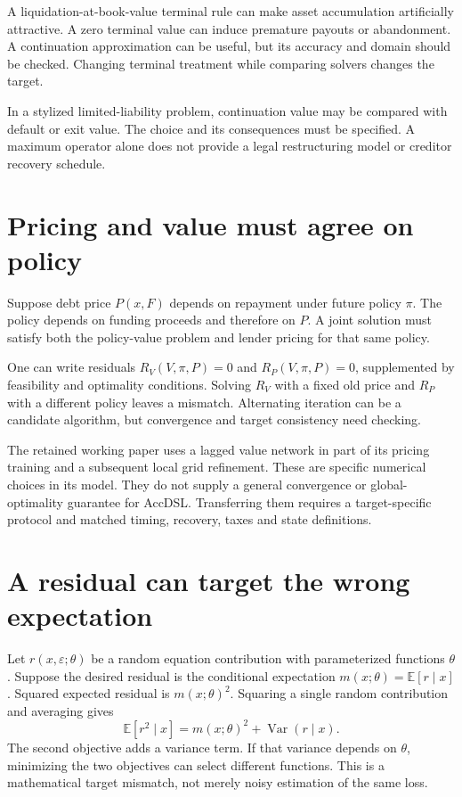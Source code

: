 A liquidation-at-book-value terminal rule can make asset accumulation artificially attractive. A zero terminal value can induce premature payouts or abandonment. A continuation approximation can be useful, but its accuracy and domain should be checked. Changing terminal treatment while comparing solvers changes the target.

In a stylized limited-liability problem, continuation value may be compared with default or exit value. The choice and its consequences must be specified. A maximum operator alone does not provide a legal restructuring model or creditor recovery schedule.

\section{Pricing and value must agree on policy}
Suppose debt price $P(x,F)$ depends on repayment under future policy $\pi$. The policy depends on funding proceeds and therefore on $P$. A joint solution must satisfy both the policy-value problem and lender pricing for that same policy.

One can write residuals $R_V(V,\pi,P)=0$ and $R_P(V,\pi,P)=0$, supplemented by feasibility and optimality conditions. Solving $R_V$ with a fixed old price and $R_P$ with a different policy leaves a mismatch. Alternating iteration can be a candidate algorithm, but convergence and target consistency need checking.

The retained \citet{duarte2026} working paper uses a lagged value network in part of its pricing training and a subsequent local grid refinement. These are specific numerical choices in its model. They do not supply a general convergence or global-optimality guarantee for AccDSL. Transferring them requires a target-specific protocol and matched timing, recovery, taxes and state definitions.

\section{A residual can target the wrong expectation}
Let $r(x,\varepsilon;\theta)$ be a random equation contribution with parameterized functions $\theta$. Suppose the desired residual is the conditional expectation $m(x;\theta)=\mathbb E[r\mid x]$. Squared expected residual is $m(x;\theta)^2$. Squaring a single random contribution and averaging gives
\begin{equation}
 \mathbb E[r^2\mid x]=m(x;\theta)^2+\operatorname{Var}(r\mid x).
 \label{sim:double-sampling}
\end{equation}
The second objective adds a variance term. If that variance depends on $\theta$, minimizing the two objectives can select different functions. This is a mathematical target mismatch, not merely noisy estimation of the same loss.

